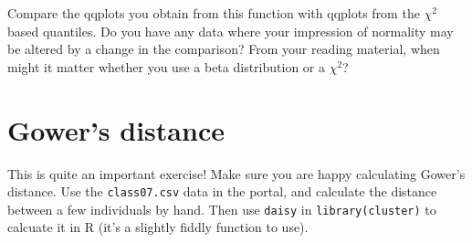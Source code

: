 \documentclass[11pt]{article}
\begin{document}
Compare the qqplots you obtain from this function with qqplots from the $\chi^{2}$ based quantiles.   Do you have any data where your impression of normality may be altered by a change in the comparison?   From your reading material, when might it matter whether you use a beta distribution or a $\chi^{2}$?

\section{Gower's distance}

This is quite an important exercise!   Make sure you are happy calculating Gower's distance.  Use the \texttt{class07.csv} data in the portal, and calculate the distance between a few individuals by hand.   Then use \texttt{daisy} in \texttt{library(cluster)} to calcuate it in R (it's a slightly fiddly function to use). 
\end{document}
